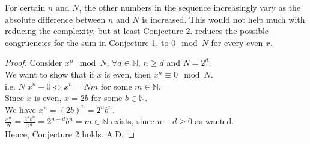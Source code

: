 \documentclass{article}
\begin{document}
\begin{flushleft}
    \vspace{.1in}

    For certain $n$ and $N$, the other numbers in the sequence increasingly vary as the absolute difference between $n$ and $N$ is increased. This  would not help much with reducing the complexity, but at least Conjecture 2. reduces the possible congruencies for the sum in Conjecture 1. to $0\mod N$ for every even $x$.

    \vspace{.1in}

    \begin{proof}
        Consider $x^n\mod N$, $\forall d\in {\mathbb{N}}$, $n\ge d$ and $N=2^d$.\\
        We want to show that if $x$ is even, then $x^n\equiv 0 \mod N$.\\
        \hspace{.2in} i.e. $N|x^n-0 \Longleftrightarrow x^n=Nm$ for some $m\in{\mathbb{N}}$.\\
        Since $x$ is even, $x=2b$ for some $b\in{\mathbb{N}}$.\\
        We have $x^n=(2b)^n=2^nb^n$.\\
        \vspace{.1in}
        $\displaystyle \frac{x^n}{N}=\frac{2^nb^n}{2^d}=2^{n-d}b^n=m\in{\mathbb{N}}$ exists, since $n-d\ge 0$ as wanted.\\
        \vspace{.1in}
    Hence, Conjecture 2 holds. \hspace{2.5in} A.D.
    \end{proof}

    \vspace{.1in}


\end{flushleft}
\end{document}
